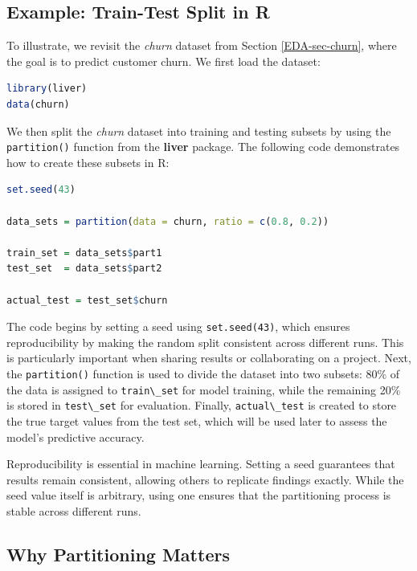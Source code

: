 \documentclass[
]{book}
\newcommand{\passthrough}[1]{#1}
\theoremstyle{definition}
\theoremstyle{definition}
\theoremstyle{definition}
\theoremstyle{definition}
\theoremstyle{remark}
\begin{document}
\subsection*{Example: Train-Test Split in R}\label{example-train-test-split-in-r}

To illustrate, we revisit the \emph{churn} dataset from Section \ref{EDA-sec-churn}, where the goal is to predict customer churn. We first load the dataset:

\begin{lstlisting}[language=R]
library(liver)
data(churn) 
\end{lstlisting}

We then split the \emph{churn} dataset into training and testing subsets by using the \passthrough{\lstinline!partition()!} function from the \textbf{liver} package. The following code demonstrates how to create these subsets in R:

\begin{lstlisting}[language=R]
set.seed(43)

data_sets = partition(data = churn, ratio = c(0.8, 0.2))

train_set = data_sets$part1
test_set  = data_sets$part2

actual_test = test_set$churn
\end{lstlisting}

The code begins by setting a seed using \passthrough{\lstinline!set.seed(43)!}, which ensures reproducibility by making the random split consistent across different runs. This is particularly important when sharing results or collaborating on a project. Next, the \passthrough{\lstinline!partition()!} function is used to divide the dataset into two subsets: 80\% of the data is assigned to \passthrough{\lstinline!train\_set!} for model training, while the remaining 20\% is stored in \passthrough{\lstinline!test\_set!} for evaluation. Finally, \passthrough{\lstinline!actual\_test!} is created to store the true target values from the test set, which will be used later to assess the model's predictive accuracy.

Reproducibility is essential in machine learning. Setting a seed guarantees that results remain consistent, allowing others to replicate findings exactly. While the seed value itself is arbitrary, using one ensures that the partitioning process is stable across different runs.

\subsection*{Why Partitioning Matters}\label{why-partitioning-matters}
\end{document}
